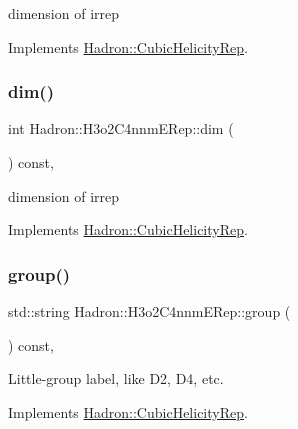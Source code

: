 dimension of irrep 

Implements \mbox{\hyperlink{structHadron_1_1CubicHelicityRep_a95d229a05580e65f8bdde74a1e316855}{Hadron\+::\+Cubic\+Helicity\+Rep}}.

\mbox{\label{structHadron_1_1H3o2C4nnmERep_a8033496b62e24970283fce0c10203e0c}} 
\subsubsection{\texorpdfstring{dim()}{dim()}\hspace{0.1cm}{\footnotesize\ttfamily [3/3]}}
{\footnotesize\ttfamily int Hadron\+::\+H3o2\+C4nnm\+E\+Rep\+::dim (\begin{DoxyParamCaption}{ }\end{DoxyParamCaption}) const\hspace{0.3cm}{\ttfamily [inline]}, {\ttfamily [virtual]}}

dimension of irrep 

Implements \mbox{\hyperlink{structHadron_1_1CubicHelicityRep_a95d229a05580e65f8bdde74a1e316855}{Hadron\+::\+Cubic\+Helicity\+Rep}}.

\mbox{\label{structHadron_1_1H3o2C4nnmERep_a94fc651e597e1a65fb7be16b3b6e8ef9}} 
\subsubsection{\texorpdfstring{group()}{group()}\hspace{0.1cm}{\footnotesize\ttfamily [1/3]}}
{\footnotesize\ttfamily std\+::string Hadron\+::\+H3o2\+C4nnm\+E\+Rep\+::group (\begin{DoxyParamCaption}{ }\end{DoxyParamCaption}) const\hspace{0.3cm}{\ttfamily [inline]}, {\ttfamily [virtual]}}

Little-\/group label, like D2, D4, etc. 

Implements \mbox{\hyperlink{structHadron_1_1CubicHelicityRep_a101a7d76cd8ccdad0f272db44b766113}{Hadron\+::\+Cubic\+Helicity\+Rep}}.

\mbox{\label{structHadron_1_1H3o2C4nnmERep_a94fc651e597e1a65fb7be16b3b6e8ef9}} 
